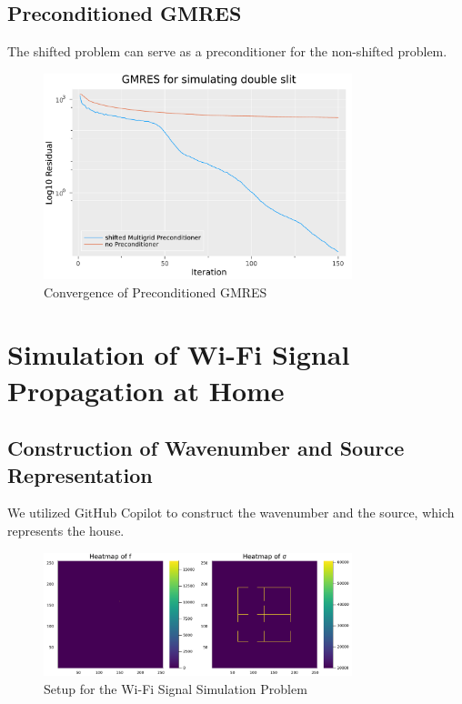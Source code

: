 \documentclass[a4paper,12pt]{article}
\begin{document}
\subsection{Preconditioned GMRES}
The shifted problem can serve as a preconditioner for the non-shifted problem.
\begin{figure}[h!]
    \centering
    \includegraphics[width=0.8\textwidth]{../plots/GMRES2slit.pdf}
    \caption{Convergence of Preconditioned GMRES}
    \label{fig:../plots/GMRES2slit.pdf}
\end{figure}

\section{Simulation of Wi-Fi Signal Propagation at Home}

\subsection{Construction of Wavenumber and Source Representation}
We utilized GitHub Copilot to construct the wavenumber and the source, which represents the house.

\begin{figure}[h!]
    \centering
    \includegraphics[width=0.8\textwidth]{../plots/wifi_setup.pdf}
    \caption{Setup for the Wi-Fi Signal Simulation Problem}
    \label{fig:../plots/wifi_setup.pdf}
\end{figure}
\end{document}
